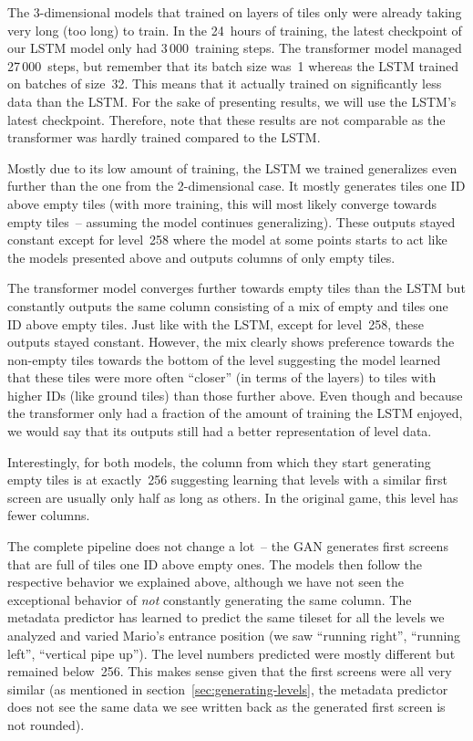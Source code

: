 The 3-dimensional models that trained on layers of tiles only were
already taking very long (too long) to train. In the 24~hours of
training, the latest checkpoint of our LSTM model only had
3\,000~training steps. The transformer model managed 27\,000~steps,
but remember that its batch size was~1 whereas the LSTM trained on
batches of size~32. This means that it actually trained on
significantly less data than the LSTM. For the sake of presenting
results, we will use the LSTM's latest checkpoint. Therefore, note
that these results are not comparable as the transformer was hardly
trained compared to the LSTM.

Mostly due to its low amount of training, the LSTM we trained
generalizes even further than the one from the 2-dimensional case. It
mostly generates tiles one ID above empty tiles (with more training,
this will most likely converge towards empty tiles~-- assuming the
model continues generalizing). These outputs stayed constant except
for level~258 where the model at some points starts to act like the
models presented above and outputs columns of only empty tiles.

The transformer model converges further towards empty tiles than the
LSTM but constantly outputs the same column consisting of a mix of
empty and tiles one ID above empty tiles. Just like with the LSTM,
except for level~258, these outputs stayed constant. However, the mix
clearly shows preference towards the non-empty tiles towards the
bottom of the level suggesting the model learned that these tiles were
more often ``closer'' (in terms of the layers) to tiles with higher
IDs (like ground tiles) than those further above. Even though and
because the transformer only had a fraction of the amount of training
the LSTM enjoyed, we would say that its outputs still had a better
representation of level data.

Interestingly, for both models, the column from which they start
generating empty tiles is at exactly~256 suggesting learning that
levels with a similar first screen are usually only half as long as
others. In the original game, this level has fewer columns.
\medskip

The complete pipeline does not change a lot~-- the GAN generates first
screens that are full of tiles one ID above empty ones. The models
then follow the respective behavior we explained above, although we
have not seen the exceptional behavior of \emph{not} constantly
generating the same column. The metadata predictor has learned to
predict the same tileset for all the levels we analyzed and varied
Mario's entrance position (we saw ``running right'', ``running left'',
``vertical pipe up''). The level numbers predicted were mostly
different but remained below~256. This makes sense given that the
first screens were all very similar (as mentioned in
section~\ref{sec:generating-levels}, the metadata predictor does not
see the same data we see written back as the generated first screen is
not rounded).


